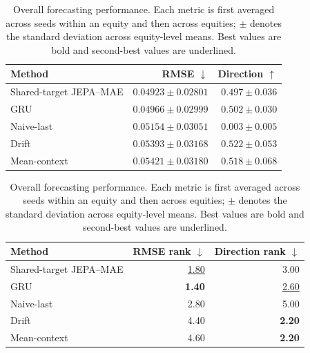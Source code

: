 \begin{table}[t]
\centering
\small
\caption{Overall forecasting performance. Each metric is first averaged across seeds within an equity and then across equities; $\pm$ denotes the standard deviation across equity-level means. Best values are bold and second-best values are underlined.}
\label{tab:main_metrics}
\begin{tabular}{lrr}
\toprule
Method & RMSE $\downarrow$ & Direction $\uparrow$ \\
\midrule
Shared-target JEPA--MAE & \textbf{$0.04923 \pm 0.02801$} & $0.497 \pm 0.036$ \\
GRU & \underline{$0.04966 \pm 0.02999$} & $0.502 \pm 0.030$ \\
Naive-last & $0.05154 \pm 0.03051$ & $0.003 \pm 0.005$ \\
Drift & $0.05393 \pm 0.03168$ & \textbf{$0.522 \pm 0.053$} \\
Mean-context & $0.05421 \pm 0.03180$ & \underline{$0.518 \pm 0.068$} \\
\bottomrule
\end{tabular}
\par\medskip
\begin{tabular}{lrr}
\toprule
Method & RMSE rank $\downarrow$ & Direction rank $\downarrow$ \\
\midrule
Shared-target JEPA--MAE & \underline{1.80} & 3.00 \\
GRU & \textbf{1.40} & \underline{2.60} \\
Naive-last & 2.80 & 5.00 \\
Drift & 4.40 & \textbf{2.20} \\
Mean-context & 4.60 & \textbf{2.20} \\
\bottomrule
\end{tabular}
\end{table}
